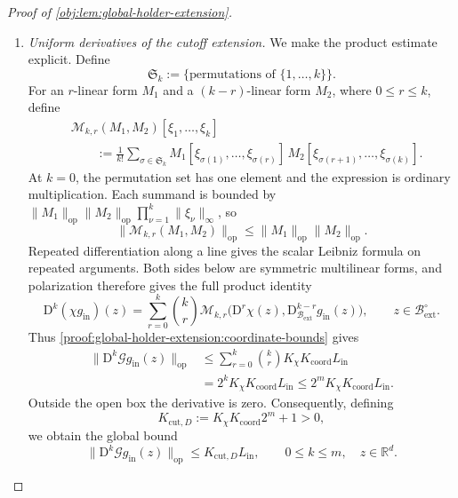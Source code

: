 \documentclass[11pt]{article}
\begin{document}
\begin{proof}[Proof of \cref{obj:lem:global-holder-extension}]
\begin{enumerate}
\item\label{proof:global-holder-extension:cutoff-derivatives} \emph{Uniform derivatives of the cutoff extension.}
We make the product estimate explicit. Define
\[
\mathfrak S_k:=\{\text{permutations of }\{1,\ldots,k\}\}.
\]
For an \(r\)-linear form \(M_1\) and a \((k-r)\)-linear form \(M_2\), where \(0\le r\le k\), define
\[
\begin{aligned}
&\mathcal M_{k,r}(M_1,M_2)[\xi_1,\ldots,\xi_k]\\
&\qquad:=
\frac1{k!}\sum_{\sigma\in\mathfrak S_k}
M_1[\xi_{\sigma(1)},\ldots,\xi_{\sigma(r)}]\,
M_2[\xi_{\sigma(r+1)},\ldots,\xi_{\sigma(k)}].
\end{aligned}
\]
At \(k=0\), the permutation set has one element and the expression is ordinary multiplication. Each summand is bounded by
\(\|M_1\|_{\mathrm{op}}\|M_2\|_{\mathrm{op}}
\prod_{\nu=1}^k\|\xi_\nu\|_\infty\), so
\[
\|\mathcal M_{k,r}(M_1,M_2)\|_{\mathrm{op}}
\le\|M_1\|_{\mathrm{op}}\|M_2\|_{\mathrm{op}}.
\]
Repeated differentiation along a line gives the scalar Leibniz formula on repeated arguments. Both sides below are symmetric multilinear forms, and polarization therefore gives the full product identity
\[
\mathrm D^k(\chi g_{\mathrm{in}})(z)
=
\sum_{r=0}^k\binom{k}{r}
\mathcal M_{k,r}
\bigl(\mathrm D^r\chi(z),
\mathrm D_{\mathcal B_{\mathrm{ext}}}^{k-r}g_{\mathrm{in}}(z)\bigr),
\qquad z\in\mathcal B_{\mathrm{ext}}^\circ.
\]
Thus \cref{proof:global-holder-extension:coordinate-bounds} gives
\[
\begin{aligned}
\|\mathrm D^k\mathscr G g_{\mathrm{in}}(z)\|_{\mathrm{op}}
&\le
\sum_{r=0}^k\binom{k}{r}
K_\chi K_{\mathrm{coord}}L_{\mathrm{in}}\\
&=2^kK_\chi K_{\mathrm{coord}}L_{\mathrm{in}}
\le2^mK_\chi K_{\mathrm{coord}}L_{\mathrm{in}}.
\end{aligned}
\]
Outside the open box the derivative is zero. Consequently, defining
\[
K_{\mathrm{cut},D}:=K_\chi K_{\mathrm{coord}}2^m+1>0,
\]
we obtain the global bound
\[
\|\mathrm D^k\mathscr G g_{\mathrm{in}}(z)\|_{\mathrm{op}}
\le K_{\mathrm{cut},D}L_{\mathrm{in}},
\qquad 0\le k\le m,\quad z\in\mathbb R^d.
\]


\end{enumerate}
\end{proof}
\end{document}

